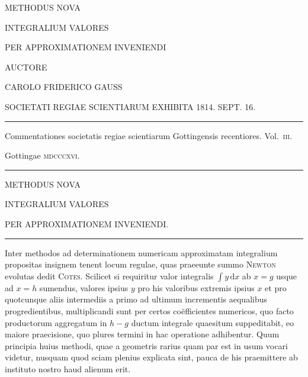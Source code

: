 \clearpage{}\thispagestyle{empty}
\begin{center}
METHODUS NOVA

\medskip
INTEGRALIUM VALORES

PER APPROXIMATIONEM INVENIENDI

AUCTORE

CAROLO FRIDERICO GAUSS

SOCIETATI REGIAE SCIENTIARUM EXHIBITA 1814. SEPT. 16.

\par\bigskip\rule{.7\linewidth}{.4pt}\par\medskip
Commentationes societatis regiae scientiarum Gottingensis recentiores. Vol.~\textsc{iii}.

Gottingae \textsc{mdcccxvi}.
\par\medskip\rule{.7\linewidth}{.4pt}
\end{center}
\clearpage{}
\begin{center}
METHODUS NOVA

INTEGRALIUM VALORES

PER APPROXIMATIONEM INVENIENDI.

\medskip\rule{.1\linewidth}{.4pt}
\end{center}
Inter methodos ad determinationem numericam approximatam integralium
propositas insignem tenent locum regulae, quas praeeunte summo \textsc{Newton}
evolutas dedit \textsc{Cotes}. Scilicet si requiritur valor integralis $\int y\,\mathrm{d}x$
ab $x=g$ usque ad $x=h$ sumendus, valores ipsius $y$ pro his valoribus extremis
ipsius $x$ et pro quotcunque aliis intermediis a primo ad ultimum incrementis
aequalibus progredientibus, multiplicandi sunt per certos co\"efficientes
numericos, quo facto productorum aggregatum in $h-g$ ductum integrale
quaesitum suppeditabit, eo maiore praecisione, quo plures termini in hac
operatione adhibentur. Quum principia huius methodi, quae a geometris rarius
quam par est in usum vocari videtur, nusquam quod sciam plenius explicata
sint, pauca de his praemittere ab instituto nostro haud alienum erit.

